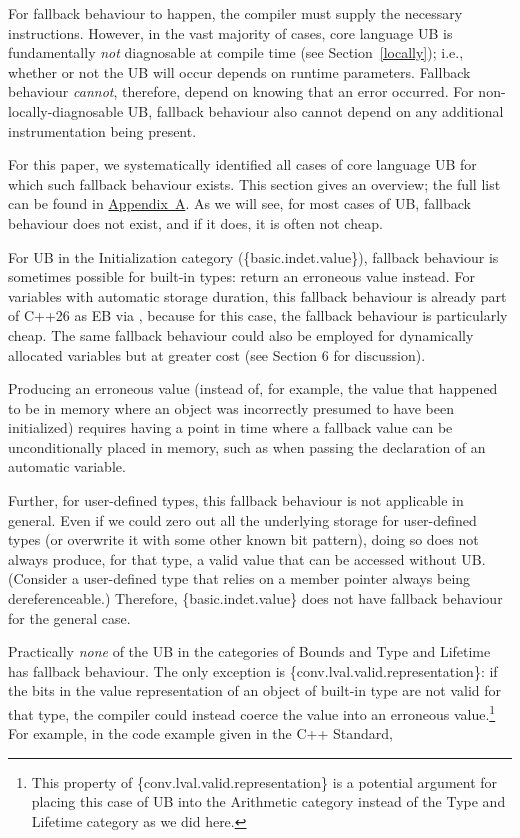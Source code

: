 For fallback behaviour to happen, the compiler must supply the necessary instructions. However, in the vast majority of cases, core language UB is fundamentally \emph{not} diagnosable at compile time (see Section~\ref{locally}); i.e., whether or not the UB will occur depends on runtime parameters. Fallback behaviour \emph{cannot}, therefore, depend on knowing that an error occurred. For non-locally-diagnosable UB, fallback behaviour also cannot depend on any additional instrumentation being present.

For this paper, we systematically identified all cases of core language UB for which such fallback behaviour exists. This section gives an overview; the full list can be found in \hyperref[appendix]{Appendix~A}. As we will see, for most cases of UB, fallback behaviour does not exist, and if it does, it is often not cheap.

For UB in the Initialization category (\{basic.indet.value\}), fallback behaviour is sometimes possible for built-in types: return an erroneous value instead. For variables with automatic storage duration, this fallback behaviour is already part of C++26 as EB via \cite{P2795R5}, because for this case, the fallback behaviour is particularly cheap. The same fallback behaviour could also be employed for dynamically allocated variables but at greater cost (see \cite{P2723R1} Section 6 for discussion).

Producing an erroneous value (instead of, for example, the value that happened to be in memory where an object was incorrectly presumed to have been initialized) requires having a point in time where a fallback value can be unconditionally placed in memory, such as when passing the declaration of an automatic variable.

Further, for user-defined types, this fallback behaviour is not applicable in general. Even if we could zero out all the underlying storage for user-defined types (or overwrite it with some other known bit pattern), doing so does not always produce, for that type, a valid value that can be accessed without UB. (Consider a user-defined type that relies on a member pointer always being dereferenceable.) Therefore, \{basic.indet.value\} does not have fallback behaviour for the general case.

Practically \emph{none} of the UB in the categories of Bounds and Type and Lifetime has fallback behaviour. The only exception is \{conv.lval.valid.representation\}: if the bits in the value representation of an object of built-in type are not valid for that type, the compiler could instead coerce the value into an erroneous value.\footnote{This property of \{conv.lval.valid.representation\} is a potential argument for placing this case of UB into the Arithmetic category instead of the Type and Lifetime category as we did here.} For example, in the code example given in the C++ Standard,

